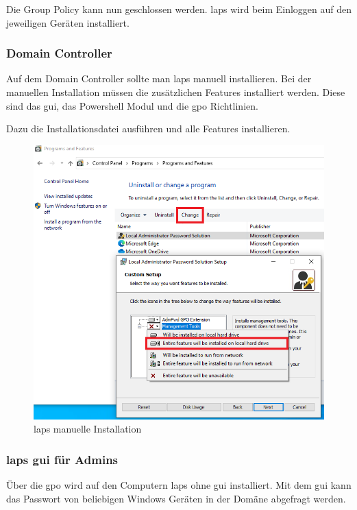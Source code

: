 Die Group Policy kann nun geschlossen werden.
\acrshort{laps} wird beim Einloggen auf den jeweiligen Geräten installiert.

\subsubsection{Domain Controller}
Auf dem Domain Controller sollte man \acrshort{laps} manuell installieren.
Bei der manuellen Installation müssen die zusätzlichen Features installiert werden.
Diese sind das \acrshort{gui}, das Powershell Modul und die \acrshort{gpo} Richtlinien.

Dazu die Installationsdatei ausführen und alle Features installieren.
\begin{figure}[H]
    \centering
    \includegraphics[width=\linewidth]{../img/LAPS/laps-ui-install-2.png}
    \caption{\acrshort{laps} manuelle Installation}
\end{figure}


\subsubsection{\acrshort{laps} \acrshort{gui} für Admins}\label{subsubsec:Laps-Gui}
Über die \acrshort{gpo} wird auf den Computern \acrshort{laps} ohne \acrshort{gui} installiert.
Mit dem \acrshort{gui} kann das Passwort von beliebigen Windows Geräten in der Domäne abgefragt werden.\\

